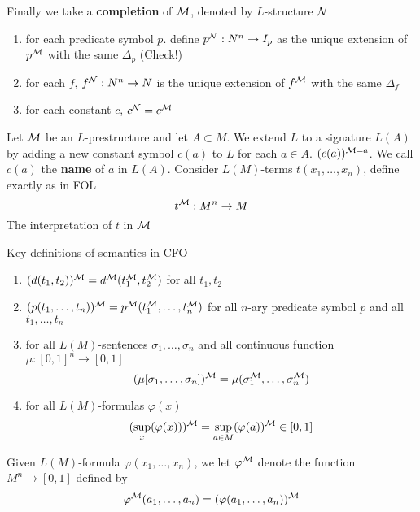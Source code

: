 \documentclass[11pt]{article}
\begin{document}
Finally we take a \textbf{completion} of \(\mathcal{M}\), denoted by \(L\)-structure \(\mathcal{N}\)
\begin{enumerate}
\item for each predicate symbol \(p\). define \(p^{\mathcal{N}}:N^n\to I_p\) as the unique extension
of \(p^{\mathcal{M}}\) with the same \(\Delta_p\) (Check!)
\item for each \(f\), \(f^{\mathcal{N}}:N^n\to N\) is the unique extension of \(f^{\mathcal{M}}\) with the same \(\Delta_f\)
\item for each constant \(c\), \(c^{\mathcal{N}}=c^{\mathcal{M}}\)
\end{enumerate}


Let \(\mathcal{M}\) be an \(L\)-prestructure and let \(A\subset M\). We extend \(L\) to a
signature \(L(A)\) by adding a new constant symbol \(c(a)\) to \(L\) for
each \(a\in A\). \((c(a))^{\mathcal{M}=a}\). We call \(c(a)\) the \textbf{name} of \(a\) in \(L(A)\).
Consider \(L(M)\)-terms \(t(x_1,\dots,x_n)\), define exactly as in FOL
\begin{equation*}
 t^{\mathcal{M}}:M^n\to M
\end{equation*}
The interpretation of \(t\) in \(\mathcal{M}\)

\uline{Key definitions of semantics in CFO}
\begin{enumerate}
\item \((d(t_1,t_2))^{\mathcal{M}}=d^{\mathcal{M}}(t_1^{\mathcal{M}},t_2^{\mathcal{M}})\) for all \(t_1,t_2\)
\item \((p(t_1,\dots,t_n))^{\mathcal{M}}=p^{\mathcal{M}}(t_1^{\mathcal{M}},\dots,t_n^{\mathcal{M}})\) for all \(n\)-ary
predicate symbol \(p\) and all \(t_1,\dots,t_n\)
\item for all \(L(M)\)-sentences \(\sigma_1,\dots,\sigma_n\) and all continuous
function \(\mu:[0,1]^n\to[0,1]\)
  \begin{equation*}
(\mu[\sigma_1,\dots,\sigma_n])^{\mathcal{M}}=\mu(\sigma_1^{\mathcal{M}},\dots,\sigma_n^{\mathcal{M}})
  \end{equation*}
\item for all \(L(M)\)-formulas \(\varphi(x)\)
  \begin{align*}
(\sup_x(\varphi(x)))^{\mathcal{M}}=\sup_{a\in M}(\varphi(a))^{\mathcal{M}}\in[0,1]
  \end{align*}
\end{enumerate}


Given \(L(M)\)-formula \(\varphi(x_1,\dots,x_n)\), we let \(\varphi^{\mathcal{M}}\) denote the function
\(M^n\to[0,1]\) defined by
\begin{equation*}
 \varphi^{\mathcal{M}}(a_1,\dots,a_n)=(\varphi(a_1,\dots,a_n))^{\mathcal{M}}
\end{equation*}
\end{document}
